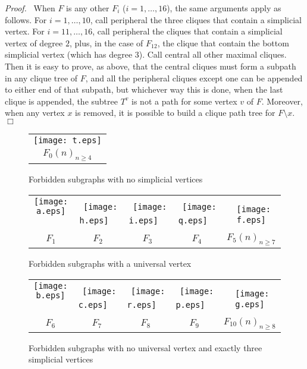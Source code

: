\documentclass[11pt]{article}
\newenvironment{proof}{\noindent \emph{Proof.}\ }{\hfill
    $\Box$\vspace{1em}}
\begin{document}
\begin{proof}
When $F$ is any other $F_i$ ($i=1, \ldots, 16$), the same arguments
apply as follows.  For $i=1, \ldots, 10$, call peripheral the three
cliques that contain a simplicial vertex.  For $i=11, \ldots, 16$,
call peripheral the cliques that contain a simplicial vertex of degree
$2$, plus, in the case of $F_{12}$, the clique that contain the bottom
simplicial vertex (which has degree $3$).  Call central all other
maximal cliques.  Then it is easy to prove, as above, that the central
cliques must form a subpath in any clique tree of $F$, and all the
peripheral cliques except one can be appended to either end of that
subpath, but whichever way this is done, when the last clique is
appended, the subtree $T^v$ is not a path for some vertex $v$ of $F$.
Moreover, when any vertex $x$ is removed, it is possible to build a
clique path tree for $F\setminus x$.
\end{proof}



    \begin{figure}[e]
      \centering
\begin{tabular}{c}
\texttt{[image: t.eps]} \\
$F_0(n)_{n\geq 4}$ \\
\end{tabular}
\caption{Forbidden subgraphs with no simplicial vertices}
\label{fig:nosimpl}
    \end{figure}


    \begin{figure}[e]
      \centering
\begin{tabular}{ccccc}
\texttt{[image: a.eps]} \ &\
\texttt{[image: h.eps]} \ &\
\texttt{[image: i.eps]} \ &\
\texttt{[image: q.eps]} \ &\
\texttt{[image: f.eps]} \\
$F_1$ & $F_2$ & $F_3$ & $F_4$ & $F_5(n)_{n\geq 7}$
\end{tabular}
      \caption{Forbidden subgraphs with a universal vertex}
\label{fig:univ}
    \end{figure}

    \begin{figure}[e]
      \centering
\begin{tabular}{ccccc}
\texttt{[image: b.eps]} \ &\
\texttt{[image: c.eps]} \ &\
\texttt{[image: r.eps]} \ &\
\texttt{[image: p.eps]}  \ &\
\texttt{[image: g.eps]} \\
$F_6$ & $F_7$ & $F_8$ & $F_9$ & $F_{10}(n)_{n\geq 8}$ \\
\end{tabular}
      \caption{Forbidden subgraphs with no universal vertex and exactly
      three simplicial vertices}
\label{fig:3simpl}
    \end{figure}
\end{document}
